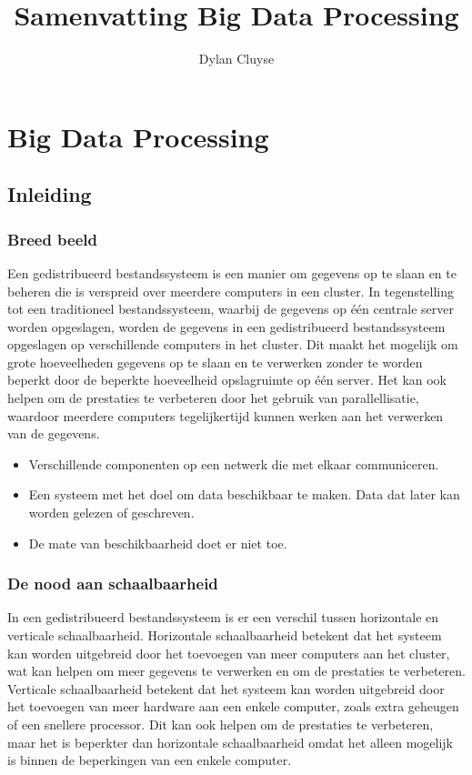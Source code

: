 \documentclass[a4paper,10pt,twoside]{report}
\title{Samenvatting Big Data Processing}
\author{Dylan {Cluyse}}
\begin{document}
	
\maketitle

\tableofcontents
	
\chapter{Big Data Processing}

\section{Inleiding}

\subsection{Breed beeld}

Een gedistribueerd bestandssysteem is een manier om gegevens op te slaan en te beheren die is verspreid over meerdere computers in een cluster. In tegenstelling tot een traditioneel bestandssysteem, waarbij de gegevens op één centrale server worden opgeslagen, worden de gegevens in een gedistribueerd bestandssysteem opgeslagen op verschillende computers in het cluster. Dit maakt het mogelijk om grote hoeveelheden gegevens op te slaan en te verwerken zonder te worden beperkt door de beperkte hoeveelheid opslagruimte op één server. Het kan ook helpen om de prestaties te verbeteren door het gebruik van parallellisatie, waardoor meerdere computers tegelijkertijd kunnen werken aan het verwerken van de gegevens.

\begin{itemize}
	\item Verschillende componenten op een netwerk die met elkaar communiceren.
	\item Een systeem met het doel om data beschikbaar te maken. Data dat later kan worden gelezen of geschreven.
	\item De mate van beschikbaarheid doet er niet toe.
\end{itemize}

\subsection{De nood aan schaalbaarheid}

In een gedistribueerd bestandssysteem is er een verschil tussen horizontale en verticale schaalbaarheid. Horizontale schaalbaarheid betekent dat het systeem kan worden uitgebreid door het toevoegen van meer computers aan het cluster, wat kan helpen om meer gegevens te verwerken en om de prestaties te verbeteren. Verticale schaalbaarheid betekent dat het systeem kan worden uitgebreid door het toevoegen van meer hardware aan een enkele computer, zoals extra geheugen of een snellere processor. Dit kan ook helpen om de prestaties te verbeteren, maar het is beperkter dan horizontale schaalbaarheid omdat het alleen mogelijk is binnen de beperkingen van een enkele computer.
\end{document}
